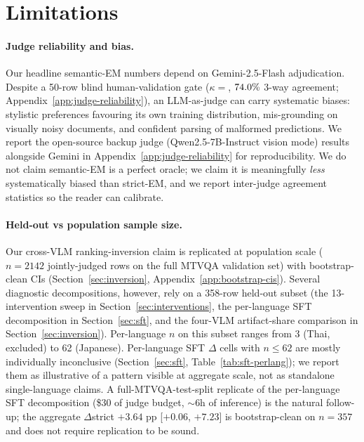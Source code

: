 \section*{Limitations}
\label{sec:limitations}

\paragraph{Judge reliability and bias.}
Our headline semantic-EM numbers depend on Gemini-2.5-Flash adjudication. Despite a 50-row blind human-validation gate ($\kappa = $\hjkappa, $74.0\%$ 3-way agreement; Appendix~\ref{app:judge-reliability}), an LLM-as-judge can carry systematic biases: stylistic preferences favouring its own training distribution, mis-grounding on visually noisy documents, and confident parsing of malformed predictions. We report the open-source backup judge (Qwen2.5-7B-Instruct vision mode) results alongside Gemini in Appendix~\ref{app:judge-reliability} for reproducibility. We do not claim semantic-EM is a perfect oracle; we claim it is meaningfully \emph{less} systematically biased than strict-EM, and we report inter-judge agreement statistics so the reader can calibrate.

\paragraph{Held-out vs population sample size.}
Our cross-VLM ranking-inversion claim is replicated at population scale ($n=2142$ jointly-judged rows on the full MTVQA validation set) with bootstrap-clean CIs (Section~\ref{sec:inversion}, Appendix~\ref{app:bootstrap-cis}). Several diagnostic decompositions, however, rely on a 358-row held-out subset (the 13-intervention sweep in Section~\ref{sec:interventions}, the per-language SFT decomposition in Section~\ref{sec:sft}, and the four-VLM artifact-share comparison in Section~\ref{sec:inversion}). Per-language $n$ on this subset ranges from 3 (Thai, excluded) to 62 (Japanese). Per-language SFT $\Delta$ cells with $n \leq 62$ are mostly individually inconclusive (Section~\ref{sec:sft}, Table~\ref{tab:sft-perlang}); we report them as illustrative of a pattern visible at aggregate scale, not as standalone single-language claims. A full-MTVQA-test-split replicate of the per-language SFT decomposition (\$30 of judge budget, $\sim$6h of inference) is the natural follow-up; the aggregate $\Delta$strict $+3.64$ pp [$+0.06$, $+7.23$] is bootstrap-clean on $n=357$ and does not require replication to be sound.

